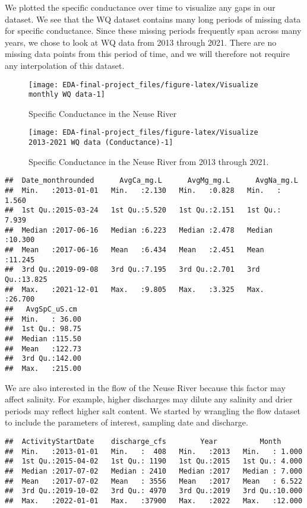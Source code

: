 \documentclass[
  12pt,
]{article}
\begin{document}
We plotted the specific conductance over time to visualize any gaps in
our dataset. We see that the WQ dataset contains many long periods of
missing data for specific conductance. Since these missing periods
frequently span across many years, we chose to look at WQ data from 2013
through 2021. There are no missing data points from this period of time,
and we will therefore not require any interpolation of this dataset.

\begin{figure}

\texttt{[image: EDA-final-project\_files/figure-latex/Visualize monthly WQ data-1]} \hfill{}

\caption{Specific Conductance in the Neuse River}\label{fig:Visualize monthly WQ data}
\end{figure}

\begin{figure}

\texttt{[image: EDA-final-project\_files/figure-latex/Visualize 2013-2021 WQ data (Conductance)-1]} \hfill{}

\caption{Specific Conductance in the Neuse River from 2013 through 2021.}\label{fig:Visualize 2013-2021 WQ data (Conductance)}
\end{figure}

\begin{verbatim}
##  Date_monthrounded      AvgCa_mg.L      AvgMg_mg.L      AvgNa_mg.L    
##  Min.   :2013-01-01   Min.   :2.130   Min.   :0.828   Min.   : 1.560  
##  1st Qu.:2015-03-24   1st Qu.:5.520   1st Qu.:2.151   1st Qu.: 7.939  
##  Median :2017-06-16   Median :6.223   Median :2.478   Median :10.300  
##  Mean   :2017-06-16   Mean   :6.434   Mean   :2.451   Mean   :11.245  
##  3rd Qu.:2019-09-08   3rd Qu.:7.195   3rd Qu.:2.701   3rd Qu.:13.825  
##  Max.   :2021-12-01   Max.   :9.805   Max.   :3.325   Max.   :26.700  
##   AvgSpC_uS.cm   
##  Min.   : 36.00  
##  1st Qu.: 98.75  
##  Median :115.50  
##  Mean   :122.73  
##  3rd Qu.:142.00  
##  Max.   :215.00
\end{verbatim}

We are also interested in the flow of the Neuse River because this
factor may affect salinity. For example, higher discharges may dilute
any salinity and drier periods may reflect higher salt content. We
started by wrangling the flow dataset to include the parameters of
interest, sampling date and discharge.

\begin{verbatim}
##  ActivityStartDate    discharge_cfs        Year          Month       
##  Min.   :2013-01-01   Min.   :  408   Min.   :2013   Min.   : 1.000  
##  1st Qu.:2015-04-02   1st Qu.: 1190   1st Qu.:2015   1st Qu.: 4.000  
##  Median :2017-07-02   Median : 2410   Median :2017   Median : 7.000  
##  Mean   :2017-07-02   Mean   : 3556   Mean   :2017   Mean   : 6.522  
##  3rd Qu.:2019-10-02   3rd Qu.: 4970   3rd Qu.:2019   3rd Qu.:10.000  
##  Max.   :2022-01-01   Max.   :37900   Max.   :2022   Max.   :12.000
\end{verbatim}
\end{document}
